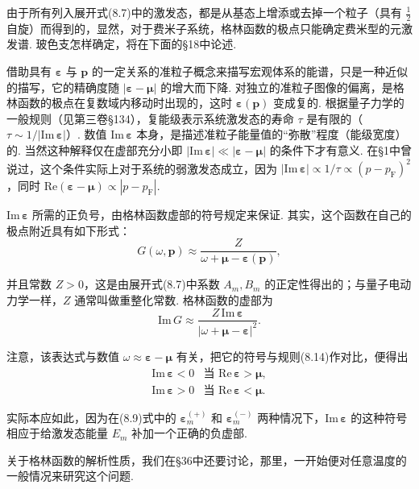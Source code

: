 由于所有列入展开式(8.7)中的激发态，都是从基态上增添或去掉一个粒子（具有 $\frac12$ 自旋）而得到的，显然，对于费米子系统，格林函数的极点只能确定费米型的元激发谱. 玻色支怎样确定，将在下面的§18中论述.

借助具有 $\bm\varepsilon$ 与 $\bm p$ 的一定关系的准粒子概念来描写宏观体系的能谱，只是一种近似的描写，它的精确度随 $|\bm\varepsilon-\bm\mu|$ 的增大而下降. 对独立的准粒子图像的偏离，是格林函数的极点在复数域内移动时出现的，这时 $\bm\varepsilon(\bm p)$ 变成复的. 根据量子力学的一般规则（见第三卷§134），复能级表示系统激发态的寿命 $\tau$ 是有限的（$\tau\sim1/|\mathrm{Im}\,\bm\varepsilon|$）. 数值 $\mathrm{Im}\,\bm\varepsilon$ 本身，是描述准粒子能量值的“弥散”程度（能级宽度）的. 当然这种解释仅在虚部充分小即 $|\mathrm{Im}\,\bm\varepsilon|\ll|\bm\varepsilon-\bm\mu|$ 的条件下才有意义. 在§1中曾说过，这个条件实际上对于系统的弱激发态成立，因为 $|\mathrm{Im}\,\bm\varepsilon|\propto1/\tau\propto(p-p_{\mathrm F})^2$，同时 $\mathrm{Re}(\bm\varepsilon-\bm\mu)\propto|p-p_{\mathrm F}|$.

$\mathrm{Im}\,\bm\varepsilon$ 所需的正负号，由格林函数虚部的符号规定来保证. 其实，这个函数在自己的极点附近具有如下形式：
\begin{equation}
G(\omega,\bm p)\approx\frac{Z}{\omega+\bm\mu-\bm\varepsilon(\bm p)},
\end{equation}

并且常数 $Z>0$，这是由展开式(8.7)中系数 $A_m,B_m$ 的正定性得出的；与量子电动力学一样，$Z$ 通常叫做重整化常数. 格林函数的虚部为
\begin{equation*}
\mathrm{Im}\,G\approx\frac{Z\,\mathrm{Im}\,\bm\varepsilon}{|\omega+\bm\mu-\bm\varepsilon|^2}.
\end{equation*}

注意，该表达式与数值 $\omega\approx\bm\varepsilon-\bm\mu$ 有关，把它的符号与规则(8.14)作对比，便得出
\begin{equation}
\begin{array}{ll}
\mathrm{Im}\,\bm\varepsilon<0 & \text{当 }\mathrm{Re}\,\bm\varepsilon>\bm\mu,\\
\mathrm{Im}\,\bm\varepsilon>0 & \text{当 }\mathrm{Re}\,\bm\varepsilon<\bm\mu.
\end{array}
\end{equation}

实际本应如此，因为在(8.9)式中的 $\bm\varepsilon^{(+)}_m$ 和 $\bm\varepsilon^{(-)}_m$ 两种情况下，$\mathrm{Im}\,\bm\varepsilon$ 的这种符号相应于给激发态能量 $E_m$ 补加一个正确的负虚部.

关于格林函数的解析性质，我们在§36中还要讨论，那里，一开始便对任意温度的一般情况来研究这个问题.

